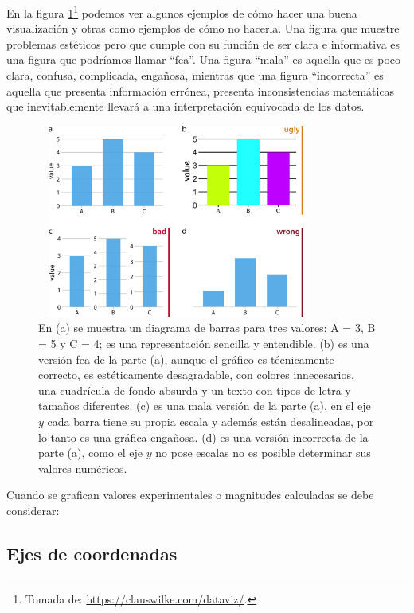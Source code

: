 En la figura \ref{estilosfig}\footnote{Tomada de: \url{https://clauswilke.com/dataviz/}.} podemos ver algunos ejemplos  de c\'omo hacer una buena visualizaci\'on y otras como ejemplos de c\'omo no hacerla.  Una figura  que muestre problemas est\'eticos pero que cumple con su funci\'on de ser clara e informativa es una figura que podr\'iamos llamar ``fea''. Una figura ``mala'' es aquella que es poco clara, confusa, complicada, enga\~nosa, mientras que una figura ``incorrecta'' es aquella que presenta informaci\'on err\'onea, presenta inconsistencias matem\'aticas que inevitablemente llevar\'a a una interpretaci\'on equivocada de los datos.
\begin{figure}[h]
\begin{center}
\includegraphics[height=2.5in,width=3.6in]{figuras/fig08}  
\caption{En (a) se muestra  un diagrama de barras para tres valores: A = 3, B = 5 y C = 4;  es una representaci\'on sencilla y entendible. (b) es una versi\'on fea de la parte (a), aunque el gr\'afico es t\'ecnicamente correcto, es est\'eticamente desagradable, con colores innecesarios, una cuadr\'icula de fondo absurda y un texto con tipos de letra y tama\~nos diferentes. (c) es una mala versi\'on de la parte (a), en el eje $y$ cada barra tiene  su propia escala y adem\'as est\'an desalineadas, por lo tanto es una gr\'afica enga\~nosa. (d) es una versi\'on incorrecta de la parte (a), como el eje $y$ no pose escalas no es posible determinar sus valores num\'ericos.}
\label{estilosfig}
\end{center}
\end{figure}


Cuando se grafican valores experimentales o magnitudes calculadas se debe considerar:

\subsection{Ejes de coordenadas}

